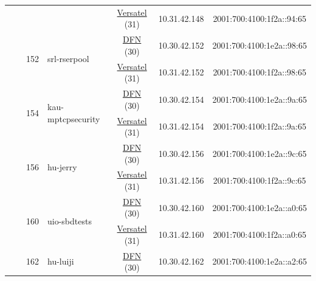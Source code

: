 \begin{small}
\begin{center}
\begin{longtable}{|c|c|c|c|c|c|c|c|}
  &  &  &  & \multicolumn{2}{|c|}{\tiny{\href{http://www.versatel.de}{Versatel} (31)}} & \tiny{10.31.42.148} & \tiny{2001:700:4100:1f2a::94:65} \\* \cline{3-3}\cline{4-4}\cline{5-5}\cline{6-6}\cline{7-7}\cline{8-8}
  &  & \multirow{2}{*}{\tiny{152}} & \multicolumn{1}{|l|}{\multirow{2}{*}{\tiny{srl-rserpool}}} & \multicolumn{2}{|c|}{\tiny{\href{https://www.dfn.de}{DFN} (30)}} & \tiny{10.30.42.152} & \tiny{2001:700:4100:1e2a::98:65} \\* \cline{5-5}\cline{6-6}\cline{7-7}\cline{8-8}
  &  &  &  & \multicolumn{2}{|c|}{\tiny{\href{http://www.versatel.de}{Versatel} (31)}} & \tiny{10.31.42.152} & \tiny{2001:700:4100:1f2a::98:65} \\* \cline{3-3}\cline{4-4}\cline{5-5}\cline{6-6}\cline{7-7}\cline{8-8}
  &  & \multirow{2}{*}{\tiny{154}} & \multicolumn{1}{|l|}{\multirow{2}{*}{\tiny{kau-mptcpsecurity}}} & \multicolumn{2}{|c|}{\tiny{\href{https://www.dfn.de}{DFN} (30)}} & \tiny{10.30.42.154} & \tiny{2001:700:4100:1e2a::9a:65} \\* \cline{5-5}\cline{6-6}\cline{7-7}\cline{8-8}
  &  &  &  & \multicolumn{2}{|c|}{\tiny{\href{http://www.versatel.de}{Versatel} (31)}} & \tiny{10.31.42.154} & \tiny{2001:700:4100:1f2a::9a:65} \\* \cline{3-3}\cline{4-4}\cline{5-5}\cline{6-6}\cline{7-7}\cline{8-8}
  &  & \multirow{2}{*}{\tiny{156}} & \multicolumn{1}{|l|}{\multirow{2}{*}{\tiny{hu-jerry}}} & \multicolumn{2}{|c|}{\tiny{\href{https://www.dfn.de}{DFN} (30)}} & \tiny{10.30.42.156} & \tiny{2001:700:4100:1e2a::9c:65} \\* \cline{5-5}\cline{6-6}\cline{7-7}\cline{8-8}
  &  &  &  & \multicolumn{2}{|c|}{\tiny{\href{http://www.versatel.de}{Versatel} (31)}} & \tiny{10.31.42.156} & \tiny{2001:700:4100:1f2a::9c:65} \\* \cline{3-3}\cline{4-4}\cline{5-5}\cline{6-6}\cline{7-7}\cline{8-8}
  &  & \multirow{2}{*}{\tiny{160}} & \multicolumn{1}{|l|}{\multirow{2}{*}{\tiny{uio-sbdtests}}} & \multicolumn{2}{|c|}{\tiny{\href{https://www.dfn.de}{DFN} (30)}} & \tiny{10.30.42.160} & \tiny{2001:700:4100:1e2a::a0:65} \\* \cline{5-5}\cline{6-6}\cline{7-7}\cline{8-8}
  &  &  &  & \multicolumn{2}{|c|}{\tiny{\href{http://www.versatel.de}{Versatel} (31)}} & \tiny{10.31.42.160} & \tiny{2001:700:4100:1f2a::a0:65} \\* \cline{3-3}\cline{4-4}\cline{5-5}\cline{6-6}\cline{7-7}\cline{8-8}
  &  & \multirow{2}{*}{\tiny{162}} & \multicolumn{1}{|l|}{\multirow{2}{*}{\tiny{hu-luiji}}} & \multicolumn{2}{|c|}{\tiny{\href{https://www.dfn.de}{DFN} (30)}} & \tiny{10.30.42.162} & \tiny{2001:700:4100:1e2a::a2:65} \\* \cline{5-5}\cline{6-6}\cline{7-7}\cline{8-8}

\end{longtable}
\end{center}
\end{small}
